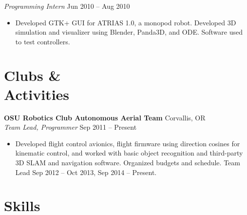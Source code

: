 \documentclass[10pt,letterpaper,margin]{res}
\begin{document}
\begin{resume}
{\it Programming Intern} \hfill {\color{lightgray} Jun 2010 -- Aug 2010}\vspace{0.0em}

\begin{itemize}
    \item Developed GTK+ GUI for ATRIAS 1.0, a monopod robot. Developed 3D
        simulation and visualizer using Blender, Panda3D, and ODE. Software
        used to test controllers.
\end{itemize}



\section{Clubs \& \\ Activities}

{\bf OSU Robotics Club Autonomous Aerial Team} \hfill {\color{lightgray} Corvallis, OR} \\
{\it Team Lead, Programmer} \hfill {\color{lightgray} Sep 2011 -- Present}\vspace{0.0em}

\begin{itemize}
    \item Developed flight control avionics, flight firmware using direction
      cosines for kinematic control, and worked with basic object recognition
      and third-party 3D SLAM and navigation software. Organized budgets and
      schedule. Team Lead Sep 2012 -- Oct 2013, Sep 2014 -- Present.
\end{itemize}



%
%


\section{Skills}


\end{resume}
\end{document}
